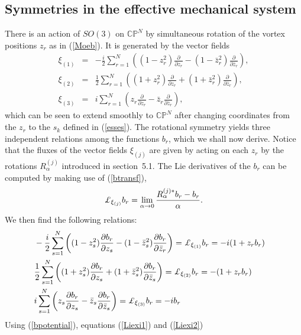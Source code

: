 \documentclass[a4paper,11pt]{article}
\newcommand{\D}{\displaystyle}
\begin{document}
\subsection {Symmetries in the effective mechanical system}


There is an action of $SO(3)$ on $\mathbb{CP}^{N}$ by simultaneous 
rotation of the vortex positions $z_{r}$ as in (\ref{Moeb}). It is
generated by the vector fields
\begin{eqnarray}
\xi_{(1)}&=&-\frac{i}{2}\sum_{r=1}^{N}\left((1-z_{r}^{2})
\frac{\partial}{\partial z_{r}}- (1-\bar{z}_{r}^{2})\frac{\partial}
{\partial \bar{z}_{r}}\right) \label{csi1},\\ 
\xi_{(2)}&=&\frac{1}{2}\sum_{r=1}^{N}\left((1+z_{r}^{2})\frac{\partial}
{\partial z_{r}}+
(1+\bar{z}_{r}^{2})\frac{\partial}{\partial \bar{z}_{r}}\right)\label{csi2},\\
\xi_{(3)}&=&i\sum_{r=1}^{N}\left(z_{r}\frac{\partial}{\partial z_{r}}-
\bar{z}_{r}\frac{\partial}{\partial \bar{z}_{r}}\right)\label{csi3},
\end{eqnarray}
which can be seen to extend smoothly to $\mathbb{CP}^{N}$ after changing 
coordinates from the $z_{r}$ to the $s_{k}$ defined in (\ref{esses}). 
The rotational symmetry yields three independent relations among the
functions $b_{r}$, which we shall now derive.
Notice that the fluxes of the vector fields $\xi_{(j)}$ are given by
acting on each $z_{r}$ by the rotations $R^{(j)}_{\alpha}$ introduced 
in section~5.1.
The Lie derivatives of the $b_{r}$ can be computed by making use 
of (\ref{btransf}),
\[
{\rm \pounds}_{\xi_{(j)}}b_{r}=
\lim_{\alpha\rightarrow 0}\frac{R_{\alpha}^{(j)*}b_{r}-b_{r}}{\alpha}.
\]
We then find the following relations:
\begin{eqnarray}
&\D -\frac{i}{2}\sum_{s=1}^{N}\left((1-z_{s}^{2})\frac{\partial b_{r}}{\partial z_{s}}-
(1-\bar{z}_{s}^{2})\frac{\partial b_{r}} {\partial \bar{z}_{r}}\right)=
{\rm \pounds}_{\xi_{(1)}}b_{r}=-i(1+z_{r}b_{r})& \label{Liexi1}\\
& \D \frac{1}{2}\sum_{s=1}^{N}\left((1+z_{s}^{2})\frac{\partial b_{r}} {\partial z_{s}}+
(1+\bar{z}_{s}^{2})\frac{\partial b_{r}}{\partial \bar{z}_{s}}\right)=
{\rm \pounds}_{\xi_{(2)}}b_{r}=-(1+z_{r}b_{r}) &\label{Liexi2}\\
&\D i\sum_{s=1}^{N}\left(z_{s}\frac{\partial b_{r}}{\partial z_{s}}-
\bar{z}_{s}\frac{\partial b_{r}}{\partial \bar{z}_{s}}\right)=
{\rm \pounds}_{\xi_{(3)}}b_{r}=-ib_{r} &\label{Liexi3}
\end{eqnarray}
Using (\ref{bpotential}), equations (\ref{Liexi1}) and (\ref{Liexi2})
\end{document}
